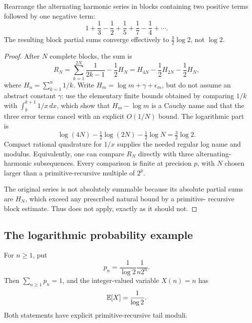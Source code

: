 \begin{theorem}\label{thm:rearrange}
Rearrange the alternating harmonic series in blocks containing two positive
terms followed by one negative term:
\[
 1+\frac13-\frac12+\frac15+\frac17-\frac14+\cdots.
\]
The resulting block partial sums converge effectively to
\(\tfrac32\log2\), not \(\log2\).
\end{theorem}

\begin{proof}
After \(N\) complete blocks, the sum is
\[
 R_N=\sum_{k=1}^{2N}\frac1{2k-1}-\frac12H_N
 =H_{4N}-\frac12H_{2N}-\frac12H_N,
\]
where \(H_n=\sum_{k=1}^n1/k\).  Write
\(H_m=\log m+\gamma+\epsilon_m\), but do not assume an abstract constant
\(\gamma\): use the elementary finite bounds obtained by comparing
\(1/k\) with \(\int_k^{k+1}1/x\,dx\), which show that
\(H_m-\log m\) is a Cauchy name and that the three error terms cancel with an
explicit \(O(1/N)\) bound.  The logarithmic part is
\[
 \log(4N)-\tfrac12\log(2N)-\tfrac12\log N
 =\tfrac32\log2.
\]
Compact rational quadrature for \(1/x\) supplies the needed regular log name
and modulus.  Equivalently, one can compare \(R_N\) directly with three
alternating-harmonic subsequences.  Every comparison is finite at precision
\(p\), with \(N\) chosen larger than a primitive-recursive multiple of
\(2^p\).

The original series is not absolutely summable because its absolute partial
sums are \(H_N\), which exceed any prescribed natural bound by a primitive-
recursive block estimate.  Thus  does not apply, exactly as it
should not.
\end{proof}

\subsection{The logarithmic probability example}

\begin{proposition}
\label{prop:log-law}
For \(n\ge1\), put
\[
 p_n=\frac{1}{\log2}\frac1{n2^n}.
\]
Then \(\sum_{n\ge1}p_n=1\), and the integer-valued variable \(X(n)=n\) has
\[
 \mathbb E[X]=\frac1{\log2}.
\]
Both statements have explicit primitive-recursive tail moduli.
\end{proposition}

